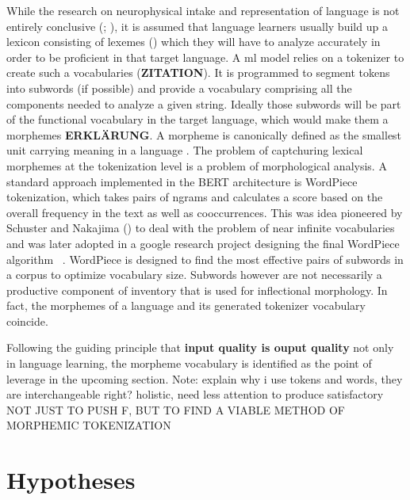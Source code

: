 While the research on neurophysical intake and representation of language is not entirely conclusive (\textcite[1--3]{n400}; \textcite{L2morphology}), it is assumed that language learners usually build up a lexicon consisting of lexemes (\cite[82 -- 100]{brennan2022language}) which they will have to analyze accurately in order to be proficient in that target language.
A \ac{ml} model relies on a tokenizer to create such a vocabularies  (\textbf{ZITATION}).
It is programmed to segment tokens into subwords (if possible) and provide a vocabulary comprising all the components needed to analyze a given string.
Ideally those subwords will be part of the functional vocabulary in the target language, which would make them a morphemes \textbf{ERKLÄRUNG}.
A morpheme is canonically defined as the smallest unit carrying meaning in a language \cite{morpheme}.
The problem of captchuring lexical morphemes at the tokenization level is a problem of morphological analysis.
A standard approach implemented in the BERT architecture is WordPiece tokenization, which takes pairs of ngrams and calculates a score based on the overall frequency in the text as well as cooccurrences.
This was idea pioneered by Schuster and Nakajima (\citeyear{WORDPIECEOG}) to deal with the problem of near infinite vocabularies and was later adopted in a google research project designing the final WordPiece algorithm ~\cite{WORDPIECEGOOGLE}.
WordPiece is designed to find the most effective pairs of subwords in a corpus to optimize vocabulary size.
Subwords however are not necessarily a productive component of inventory that is used for inflectional morphology.
In fact, the morphemes of a language and its generated tokenizer vocabulary  coincide.

\cite{FLOTA}

Following the guiding principle that \textbf{input quality is ouput quality} not only in language learning, the morpheme vocabulary is identified as the point of leverage in the upcoming section.
Note: explain why i use tokens and words, they are interchangeable right?
holistic, need less attention to produce satisfactory
\uppercase{not just to push F, but to find a viable method of morphemic tokenization}


\section{Hypotheses}
\label{sec:hypothesis}

